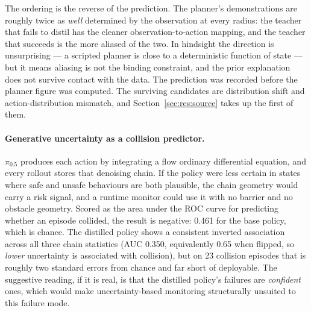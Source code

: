 The ordering is the reverse of the prediction. The planner's demonstrations are roughly twice as
\emph{well} determined by the observation at every radius: the teacher that fails to distil has the
cleaner observation-to-action mapping, and the teacher that succeeds is the more aliased of the
two. In hindsight the direction is unsurprising --- a scripted planner is close to a deterministic
function of state --- but it means aliasing is not the binding constraint, and the prior
explanation does not survive contact with the data. The prediction was recorded before the planner
figure was computed. The surviving candidates are distribution shift and action-distribution
mismatch, and Section~\ref{sec:res:source} takes up the first of them.

\paragraph{Generative uncertainty as a collision predictor.}
$\pi_{0.5}$ produces each action by integrating a flow ordinary differential equation, and every
rollout stores that denoising chain. If the policy were less certain in states where safe and
unsafe behaviours are both plausible, the chain geometry would carry a risk signal, and a runtime
monitor could use it with no barrier and no obstacle geometry. Scored as the area under the ROC
curve for predicting whether an episode collided, the result is negative: 0.461 for the base
policy, which is chance. The distilled policy shows a consistent inverted association across all
three chain statistics (AUC 0.350, equivalently 0.65 when flipped, so \emph{lower} uncertainty is
associated with collision), but on 23 collision episodes that is roughly two standard errors from
chance and far short of deployable. The suggestive reading, if it is real, is that the distilled
policy's failures are \emph{confident} ones, which would make uncertainty-based monitoring
structurally unsuited to this failure mode.
